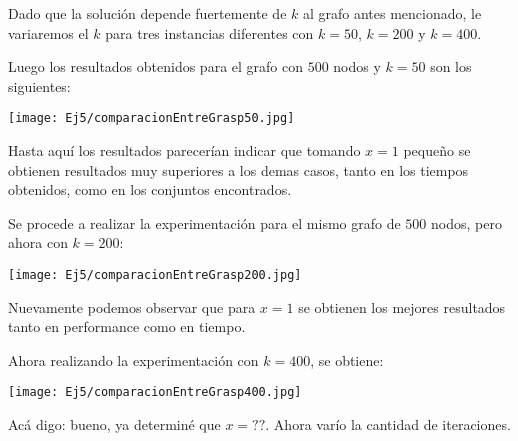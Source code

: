 Dado que la solución depende fuertemente de $k$ al grafo antes mencionado, le variaremos el $k$ para tres instancias diferentes con $k = 50$, $k = 200$ y $k = 400$.

Luego los resultados obtenidos para el grafo con $500$ nodos y $k = 50$ son los siguientes:

\texttt{[image: Ej5/comparacionEntreGrasp50.jpg]}

Hasta aquí los resultados parecerían indicar que tomando $x = 1$ pequeño se obtienen resultados muy superiores a los demas casos, tanto en los tiempos obtenidos, como en los conjuntos encontrados.

Se procede a realizar la experimentación para el mismo grafo de $500$ nodos, pero ahora con $k = 200$:

\texttt{[image: Ej5/comparacionEntreGrasp200.jpg]}

Nuevamente podemos observar que para $x = 1$ se obtienen los mejores resultados tanto en performance como en tiempo.

Ahora realizando la experimentación con $k = 400$, se obtiene:

\texttt{[image: Ej5/comparacionEntreGrasp400.jpg]}

Acá digo: bueno, ya determiné que $x = ??$. Ahora varío la cantidad de iteraciones.